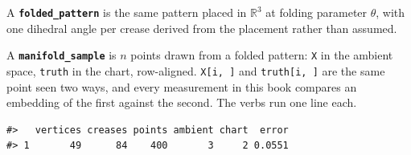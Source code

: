 \documentclass[
  british,
  a4paper,
]{book}
\newenvironment{Shaded}{\begin{snugshade}}{\end{snugshade}}
\newcommand{\AttributeTok}[1]{\textcolor[rgb]{0.13,0.29,0.53}{#1}}
\newcommand{\DataTypeTok}[1]{\textcolor[rgb]{0.13,0.29,0.53}{#1}}
\newcommand{\DecValTok}[1]{\textcolor[rgb]{0.00,0.00,0.81}{#1}}
\newcommand{\FloatTok}[1]{\textcolor[rgb]{0.00,0.00,0.81}{#1}}
\newcommand{\FunctionTok}[1]{\textcolor[rgb]{0.13,0.29,0.53}{\textbf{#1}}}
\newcommand{\NormalTok}[1]{#1}
\newcommand{\OtherTok}[1]{\textcolor[rgb]{0.56,0.35,0.01}{#1}}
\newcommand{\SpecialCharTok}[1]{\textcolor[rgb]{0.81,0.36,0.00}{\textbf{#1}}}
\newcommand{\StringTok}[1]{\textcolor[rgb]{0.31,0.60,0.02}{#1}}
\begin{document}
A \textbf{\texttt{folded\_pattern}} is the same pattern placed in \(\mathbb{R}^3\) at folding
parameter \(\theta\), with one dihedral angle per crease derived from the
placement rather than assumed.

A \textbf{\texttt{manifold\_sample}} is \(n\) points drawn from a folded pattern: \texttt{X} in the
ambient space, \texttt{truth} in the chart, row-aligned. \texttt{X{[}i,\ {]}} and \texttt{truth{[}i,\ {]}} are
the same point seen two ways, and every measurement in this book compares an
embedding of the first against the second. The verbs run one line each.

\begin{Shaded}
\end{Shaded}

\begin{verbatim}
#>   vertices creases points ambient chart  error
#> 1       49      84    400       3     2 0.0551
\end{verbatim}
\end{document}
